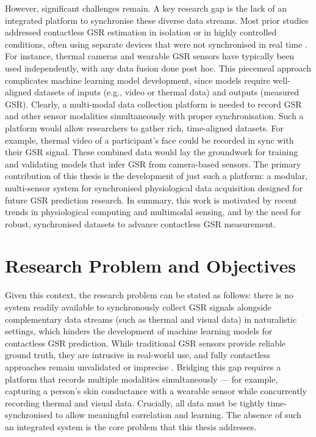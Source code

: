 However, significant challenges remain. A key research gap is the lack of an integrated platform to synchronise these diverse data streams. Most prior studies addressed contactless GSR estimation in isolation or in highly controlled conditions, often using separate devices that were not synchronised in real time \citep{ref7}. For instance, thermal cameras and wearable GSR sensors have typically been used independently, with any data fusion done post hoc. This piecemeal approach complicates machine learning model development, since models require well-aligned datasets of inputs (e.g., video or thermal data) and outputs (measured GSR). Clearly, a multi-modal data collection platform is needed to record GSR and other sensor modalities simultaneously with proper synchronisation. Such a platform would allow researchers to gather rich, time-aligned datasets. For example, thermal video of a participant's face could be recorded in sync with their GSR signal. These combined data would lay the groundwork for training and validating models that infer GSR from camera-based sensors. The primary contribution of this thesis is the development of just such a platform: a modular, multi-sensor system for synchronised physiological data acquisition designed for future GSR prediction research. In summary, this work is motivated by recent trends in physiological computing and multimodal sensing, and by the need for robust, synchronised datasets to advance contactless GSR measurement.

\section{Research Problem and Objectives}
Given this context, the research problem can be stated as follows: there is no system readily available to synchronously collect GSR signals alongside complementary data streams (such as thermal and visual data) in naturalistic settings, which hinders the development of machine learning models for contactless GSR prediction. While traditional GSR sensors provide reliable ground truth, they are intrusive in real-world use, and fully contactless approaches remain unvalidated or imprecise \citep{ref8}. Bridging this gap requires a platform that records multiple modalities simultaneously --- for example, capturing a person's skin conductance with a wearable sensor while concurrently recording thermal and visual data. Crucially, all data must be tightly time-synchronised to allow meaningful correlation and learning. The absence of such an integrated system is the core problem that this thesis addresses.

